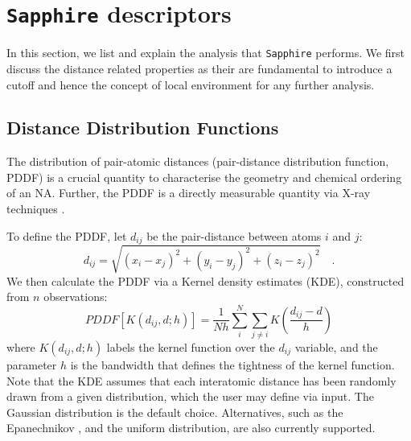 \section{\texttt{Sapphire} descriptors}
\label{sec:PDDF}

In this section, we list and explain the analysis that \texttt{Sapphire} performs. We first discuss the distance related properties as their are fundamental to introduce a cutoff and hence the concept of local environment for any further analysis.

\subsection{Distance Distribution Functions}
The distribution of pair-atomic distances (pair-distance distribution function, PDDF) is a crucial quantity to characterise the geometry and chemical ordering of an NA. 
Further, the PDDF is a directly measurable quantity via X-ray techniques \cite{Neder_2005,Nederkc5105}.
%

To define the PDDF, let $d_{ij}$ be the pair-distance between atoms $i$ and $j$:
\begin{equation}
    d_{ij} = \sqrt{ (x_{i}-x_{j})^{2} + (y_{i}-y_{j})^{2} + (z_{i}-z_{j})^{2} } \mbox{~~~.} 
\end{equation}
We then calculate the PDDF via a Kernel density estimates (KDE), constructed from $n$ observations:
\begin{equation}
    PDDF\left[K\left(d_{ij},d;h\right)\right] = \frac{1}{Nh} \sum_{i}^{N} \sum_{j\neq i} K\left(\frac{d_{ij}-d}{h}\right)
    \label{eqn:KEDE}
\end{equation}
%
where $K\left(d_{ij},d;h\right)$ labels the kernel function over the $d_{ij}$ variable, and the parameter $h$ is the bandwidth that defines the tightness of the kernel function.
%
Note that the KDE assumes that each interatomic distance has been randomly drawn from a given distribution, which the user may define via input.
The Gaussian distribution is the default choice.
Alternatives, such as the Epanechnikov \cite{epan}, and the uniform distribution, are also currently supported. 

